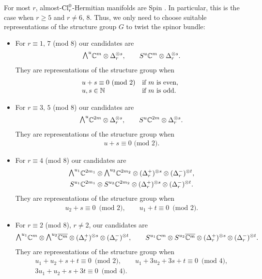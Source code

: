 \documentclass[pdftex]{sigma}
\newcommand{\ext}{\raise1pt\hbox{$\textstyle\bigwedge$}}
\newcommand{\sym}{S}
\numberwithin{equation}{section}
\begin{document}
For most $r$, almost-${\rm Cl}_r^0$-Hermitian manifolds are Spin \cite[Theorem~4.1]{Arizmendi-Garcia-Herrera}. In particular, this is the case when $r\geq 5$ and $r\not= 6,\,8$. Thus, we only need to choose suitable representations of the structure group $G$ to twist the spinor bundle:
\begin{itemize}\itemsep=0pt
 \item For $r\equiv 1,\,7$ (mod 8) our candidates are
 \begin{gather*}\ext^u \mathbb{C}^m\otimes \Delta_r^{\otimes s}, \qquad \sym^u\mathbb{C}^m\otimes \Delta_r^{\otimes s}.\end{gather*}
 They are representations of the structure group when
 \begin{gather*}\begin{array}{@{}ll}
u+s\equiv 0 \,\,\mbox{(mod 2)}& \text{if $m$ is even}, \\
u,s\in\mathbb{N} & \text{if $m$ is odd}.
 \end{array}
 \end{gather*}

 \item For $r\equiv 3,\,5$ (mod 8) our candidates are
 \begin{gather*}\ext^u \mathbb{C}^{2m}\otimes \Delta_r^{\otimes s},\qquad \sym^u\mathbb{C}^{2m}\otimes \Delta_r^{\otimes s}.\end{gather*}
 They are representations of the structure group when
\begin{gather*}u+s\equiv 0 \,\,\mbox{(mod 2)}.\end{gather*}

 \item For $r\equiv 4$ (mod 8) our candidates are
 \begin{gather*}\ext^{u_1} \mathbb{C}^{2m_1}\otimes \ext^{u_2} \mathbb{C}^{2m_2}\otimes (\Delta_r^+)^{\otimes s}\otimes (\Delta_r^-)^{\otimes t},
\\ \sym^{u_1}\mathbb{C}^{2m_1}\otimes \sym^{u_2}\mathbb{C}^{2m_2}\otimes (\Delta_r^+)^{\otimes s}\otimes (\Delta_r^-)^{\otimes t}.\end{gather*}
 They are representations of the structure group when
 \begin{gather*}
u_2+s \equiv 0 \,\,\,\mbox{(mod 2)},\qquad
u_1+t \equiv 0 \,\,\,\mbox{(mod 2)}.
 \end{gather*}

 \item For $r\equiv 2$ (mod 8), $r\not =2$, our candidates are
 \begin{gather*}\ext^{u_1} \mathbb{C}^{m}\otimes \ext^{u_2} \overline{\mathbb{C}^{m}}\otimes (\Delta_r^+)^{\otimes s}\otimes (\Delta_r^-)^{\otimes t},
 \qquad \sym^{u_1}\mathbb{C}^{m}\otimes \sym^{u_2}\overline{\mathbb{C}^{m}}\otimes (\Delta_r^+)^{\otimes s}\otimes (\Delta_r^-)^{\otimes t}.\end{gather*}
 They are representations of the structure group when
 \begin{gather*}
u_1+u_2+s+t \equiv 0 \,\,\,\mbox{(mod 2)},\qquad u_1+3u_2+3s+t \equiv 0 \,\,\,\mbox{(mod 4)},\\
3u_1+u_2+s+3t \equiv 0 \,\,\,\mbox{(mod 4)}.
 \end{gather*}


\end{itemize}
\end{document}
